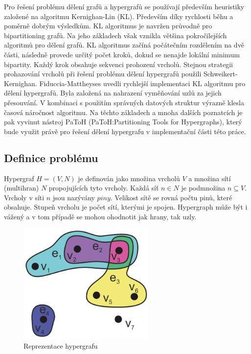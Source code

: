 \documentclass[thesis=M,czech]{FITthesis}[2012/06/26]
\begin{document}
Pro řešení problému dělení grafů a hypergrafů se používají především heuristiky založené na algoritmu Kernighan-Lin (KL). Především díky rychlosti běhu a poměrně dobrým výsledkům. KL algoritmus je navržen průvodně pro bipartitioning grafů. Na jeho základech však vznikla většina pokročilejších algoritmů pro dělení grafů. KL algoritmus začíná počátečním rozdělením na dvě části, následně provede určitý počet kroků, dokud se nenajde lokální minimum bipartity. Každý krok obsahuje sekvenci prohození vrcholů. Stejnou strategii prohazování vrcholů při řešení problému dělení hypergrafů použili Schweikert-Kernighan\cite{graph1}. Fiduccia-Mattheyses\cite{graph2} uvedli rychlejší implementaci KL algoritmu pro dělení hypergrafů. Byla založená na nahrazení vyměňování uzlů za jejich přesouvání.  V kombinaci s použitím správných datových struktur výrazně klesla časová náročnost algoritmu. Na těchto základech a mnoha dalších poznatcích je pak vyvinut nástroj PaToH (PaToH:Partitioning Tools for Hypergraphs), který bude využit právě pro řešení dělení hypergrafu v implementační části této práce.

\subsection{Definice problému}
Hypergraf $H=(V,N)$ je definován jako množina vrcholů $V$ a množina	sítí (multihran) $N$ propojujících tyto vrcholy. Každá síť $n \in N$ je podmnožina $n \subseteq V$. Vrcholy v síti $n$ jsou nazývány $piny$. Velikost sítě se rovná počtu pinů, které obsahuje. Stupeň vrcholu je počet sítí, kterými je spojen. Hypergraph může být i vážený a v tom případě se mohou ohodnotit jak hrany, tak uzly.

\begin{figure}\centering
	\includegraphics[width=0.6\textwidth, angle=0]{files/Hypergraph.png}
	\caption[Reprezentace hypergrafu]{Reprezentace hypergrafu}\label{fig:hypergraph}
\end{figure}
\end{document}
